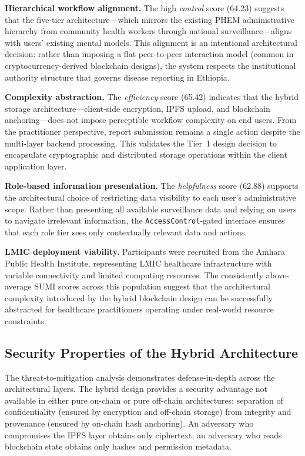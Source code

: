 \textbf{Hierarchical workflow alignment.} The high \emph{control} score (64.23) suggests that the five-tier architecture---which mirrors the existing PHEM administrative hierarchy from community health workers through national surveillance---aligns with users' existing mental models. This alignment is an intentional architectural decision: rather than imposing a flat peer-to-peer interaction model (common in cryptocurrency-derived blockchain designs), the system respects the institutional authority structure that governs disease reporting in Ethiopia.

\textbf{Complexity abstraction.} The \emph{efficiency} score (65.42) indicates that the hybrid storage architecture---client-side encryption, IPFS upload, and blockchain anchoring---does not impose perceptible workflow complexity on end users. From the practitioner perspective, report submission remains a single action despite the multi-layer backend processing. This validates the Tier~1 design decision to encapsulate cryptographic and distributed storage operations within the client application layer.

\textbf{Role-based information presentation.} The \emph{helpfulness} score (62.88) supports the architectural choice of restricting data visibility to each user's administrative scope. Rather than presenting all available surveillance data and relying on users to navigate irrelevant information, the \texttt{AccessControl}-gated interface ensures that each role tier sees only contextually relevant data and actions.

\textbf{LMIC deployment viability.} Participants were recruited from the Amhara Public Health Institute, representing LMIC healthcare infrastructure with variable connectivity and limited computing resources. The consistently above-average SUMI scores across this population suggest that the architectural complexity introduced by the hybrid blockchain design can be successfully abstracted for healthcare practitioners operating under real-world resource constraints.

\subsection{Security Properties of the Hybrid Architecture}\label{subsec:disc_security}

The threat-to-mitigation analysis demonstrates defense-in-depth across the architectural layers. The hybrid design provides a security advantage not available in either pure on-chain or pure off-chain architectures: separation of confidentiality (ensured by encryption and off-chain storage) from integrity and provenance (ensured by on-chain hash anchoring). An adversary who compromises the IPFS layer obtains only ciphertext; an adversary who reads blockchain state obtains only hashes and permission metadata.

